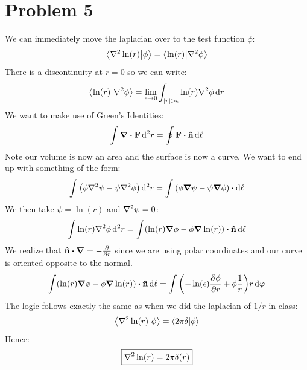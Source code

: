 \documentclass[12pt]{article}
\begin{document}
\section*{Problem 5}
We can immediately move the laplacian over to the test function $\phi$:
\begin{align*}
  \ip{\laplacian{\ln(r)}}{\phi}=\ip{\ln(r)}{\laplacian{\phi}}
\end{align*}
There is a discontinuity at $r=0$ so we can write:
\begin{align*}
  \ip{\ln(r)}{\laplacian{\phi}}=\lim_{\epsilon\to0}
  \int_{\abs{r}>\epsilon}\ln(r)\laplacian{\phi}\dd{r}
\end{align*}
We want to make use of Green's Identities:
\begin{align*}
  \int\div{\vb{F}}\dd[2]{r}=\oint\vb{F}\vdot\vu{n}\dd{\ell}
\end{align*}
Note our volume is now an area and the surface is now a curve.
We want to end up with something of the form:
\begin{align*}
  \int\qty(\phi\laplacian{\psi}-\psi\laplacian\phi)\dd[2]{r}=
  \int\qty(\phi\grad{\psi}-\psi\grad{\phi})\vdot\dd{\vb{\ell}}
\end{align*}
We then take $\psi=\ln(r)$ and $\laplacian{\psi}=0$:
\begin{align*}
  \int\ln(r)\laplacian{\phi}\dd[2]{r}=\int(\ln(r)\grad\phi-\phi\grad{\ln(r)})
  \vdot\vu{n}\dd{\ell}
\end{align*}
We realize that $\vu{n}\vdot\gradient=-\pdv{r}$ since we are using polar coordinates and our curve is oriented opposite to the normal.
\begin{align*}
  \int(\ln(r)\grad\phi-\phi\grad{\ln(r)})\vdot\vu{n}\dd{\ell}=
  \int\qty(-\ln(\epsilon)\pdv{\phi}{r}+\phi\frac{1}{r})
  r\dd{\varphi}
\end{align*}
The logic follows exactly the same as when we did the laplacian of $1/r$ in class:
\begin{align*}
  \ip{\laplacian{\ln(r)}}{\phi}=\ip{2\pi\delta}{\phi}
\end{align*}
Hence:
\begin{align}
  \boxed{
    \laplacian{\ln(r)}=2\pi\delta(r)
  }
\end{align}
\end{document}
